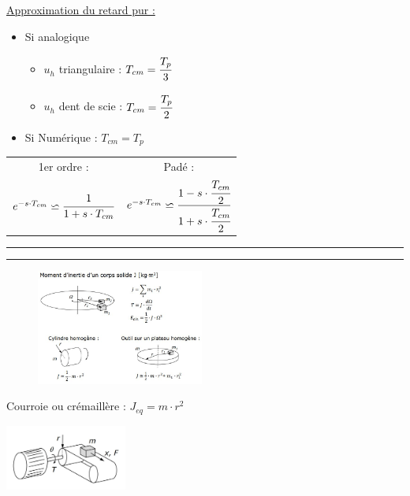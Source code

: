 \documentclass[	DIV=calc,%
							paper=a4,%
							fontsize=10pt,%
							twocolumn]{scrartcl} %
\newcommand{\hformbar}[1]{\bigskip \hrule \vspace{1pt} \hrule \vspace{5pt}} %
\newcounter{mycounter}
\newcommand{\formdesc}[1]{\large\textbf{#1} \addtocounter{mycounter}{1} \hfill \themycounter \\ \vspace{-3mm} \hrule \vspace{2mm}}
\newcommand{\formtitle}[1]{\large\underline{#1}}
\begin{document}
\formtitle{Approximation du retard pur : }
\begin{itemize}
    \item Si analogique 
        \begin{itemize}
            \item $u_h$ triangulaire : $T_{cm} = \cfrac{T_p}{3} $
            \item $u_h$ dent de scie : $T_{cm} = \cfrac{T_p}{2} $
        \end{itemize}
    \item Si Numérique : $T_{cm} = T_p $
\end{itemize}



\begin{table}
    \begin{tabular}{c | c}
        1er ordre : & Padé : \\
        {\hfill $ e^{-s\cdot T_{cm}} \backsimeq \cfrac{1}{1 + s\cdot T_{cm}} $\hfill} & {\hfill $ e^{-s\cdot T_{cm}} \backsimeq \cfrac{1 - s \cdot \cfrac{T_{cm}}{2}}{1 + s \cdot \cfrac{T_{cm}}{2}} $\hfill}
    \end{tabular}
\end{table}


\hformbar


\formdesc{Rappel sur le moment d’inertie}

\begin{figure}[H]
    \begin{center}      
        \includegraphics[width = 0.49\textwidth]{img/Rappel_inertie1.JPG}
    \end{center}
\end{figure}

Courroie ou crémaillère : $J_{eq} = m \cdot r^2$

{\centering \includegraphics[width = 0.3\textwidth]{img/Cremaillere.JPG}}
\end{document}

